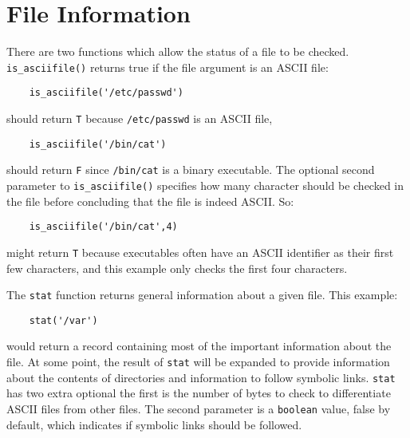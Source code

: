 \section{File Information}

\label{is_asciifile-func}
There are two functions which allow the status of a file to be checked. {\tt is\_asciifile()}
returns true if the file argument is an ASCII file:
\begin{verbatim}
    is_asciifile('/etc/passwd')
\end{verbatim}
should return {\tt T} because \verb+/etc/passwd+ is an ASCII file,
\begin{verbatim}
    is_asciifile('/bin/cat')
\end{verbatim}
should return {\tt F} since \verb+/bin/cat+ is a binary executable. The optional
second parameter to \verb+is_asciifile()+ specifies how many character should
be checked in the file before concluding that the file is indeed ASCII. So:
\begin{verbatim}
    is_asciifile('/bin/cat',4)
\end{verbatim}
might return {\tt T} because executables often have an ASCII identifier as their
first few characters, and this example only checks the first four characters.

\label{stat-func}
The {\tt stat} function returns general information about a given file. This example:
\begin{verbatim}
    stat('/var')
\end{verbatim}
would return a record containing most of the important information about
the file. At some point, the result of {\tt stat} will be expanded to
provide information about the contents of directories and information to
follow symbolic links. {\tt stat} has two extra optional the first
is the number of bytes to check to differentiate ASCII files
from other files. The second parameter is a {\tt boolean} value,
false by default, which indicates if symbolic links should be followed.
